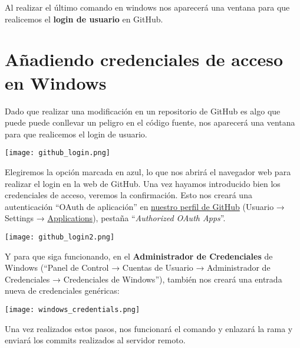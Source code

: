 Al realizar el último comando en windows nos aparecerá una ventana para que realicemos el \textbf{login de usuario} en GitHub.

\section{Añadiendo credenciales de acceso en Windows}

Dado que realizar una modificación en un repositorio de GitHub es algo que puede puede conllevar un peligro en el código fuente, nos aparecerá una ventana para que realicemos el login de usuario.

\begin{center}
    \texttt{[image: github\_login.png]}
\end{center}

Elegiremos la opción marcada en azul, lo que nos abrirá el navegador web para realizar el login en la web de GitHub. Una vez hayamos introducido bien los credenciales de acceso, veremos la confirmación. Esto nos creará una autenticación “OAuth de aplicación” en \href{https://github.com/settings/applications}{nuestro perfil de GitHub} (Usuario → Settings → \href{https://github.com/settings/applications}{Applications}), pestaña “\textit{Authorized OAuth Apps}”.

\begin{center}
    \texttt{[image: github\_login2.png]}
\end{center}

Y para que siga funcionando, en el \textbf{Administrador de Credenciales} de Windows (“Panel de Control → Cuentas de Usuario → Administrador de Credenciales → Credenciales de Windows”), también nos creará una entrada nueva de credenciales genéricas:

\begin{center}
    \texttt{[image: windows\_credentials.png]}
\end{center}

Una vez realizados estos pasos, nos funcionará el comando y enlazará la rama y enviará los commits realizados al servidor remoto.



